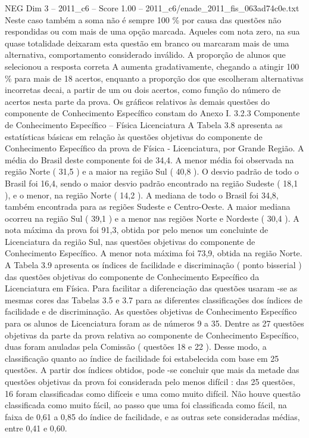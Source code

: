 \begin{textsample}{NEG Dim 3 – 2011\_c6 – Score 1.00 – 2011\_c6/enade\_2011\_fis\_063ad74c0e.txt}
Neste caso também a soma não é sempre 100 \% por causa das questões não respondidas ou com mais de uma opção marcada.
Aqueles com nota zero, na sua quase totalidade deixaram esta questão em branco ou marcaram mais de uma alternativa, comportamento considerado inválido.
A proporção de alunos que selecionou a resposta correta A aumenta gradativamente, chegando a atingir 100 \% para mais de 18 acertos, enquanto a proporção dos que escolheram alternativas incorretas decai, a partir de um ou dois acertos, como função do número de acertos nesta parte da prova.
Os gráficos relativos às demais questões do componente de Conhecimento Específico constam do Anexo I. 3.2.3 Componente de Conhecimento Específico – Física Licenciatura A Tabela 3.8 apresenta as estatísticas básicas em relação às questões objetivas do componente de Conhecimento Específico da prova de Física - Licenciatura, por Grande Região.
A média do Brasil deste componente foi de 34,4.
A menor média foi observada na região Norte ( 31,5 ) e a maior na região Sul ( 40,8 ).
O desvio padrão de todo o Brasil foi 16,4, sendo o maior desvio padrão encontrado na região Sudeste ( 18,1 ), e o menor, na região Norte ( 14,2 ).
A mediana de todo o Brasil foi 34,8, também encontrada para as regiões Sudeste e Centro-Oeste.
A maior mediana ocorreu na região Sul ( 39,1 ) e a menor nas regiões Norte e Nordeste ( 30,4 ).
A nota máxima da prova foi 91,3, obtida por pelo menos um concluinte de Licenciatura da região Sul, nas questões objetivas do componente de Conhecimento Específico.
A menor nota máxima foi 73,9, obtida na região Norte.
A Tabela 3.9 apresenta os índices de facilidade e discriminação ( ponto bisserial ) das questões objetivas do componente de Conhecimento Específico da Licenciatura em Física.
Para facilitar a diferenciação das questões usaram -se as mesmas cores das Tabelas 3.5 e 3.7 para as diferentes classificações dos índices de facilidade e de discriminação.
As questões objetivas de Conhecimento Específico para os alunos de Licenciatura foram as de números 9 a 35.
Dentre as 27 questões objetivas da parte da prova relativa ao componente de Conhecimento Específico, duas foram anuladas pela Comissão ( questões 18 e 22 ).
Desse modo, a classificação quanto ao índice de facilidade foi estabelecida com base em 25 questões.
A partir dos índices obtidos, pode -se concluir que mais da metade das questões objetivas da prova foi considerada pelo menos difícil : das 25 questões, 16 foram classificadas como difíceis e uma como muito difícil.
Não houve questão classificada como muito fácil, ao passo que uma foi classificada como fácil, na faixa de 0,61 a 0,85 do índice de facilidade, e as outras sete consideradas médias, entre 0,41 e 0,60.

\end{textsample}
